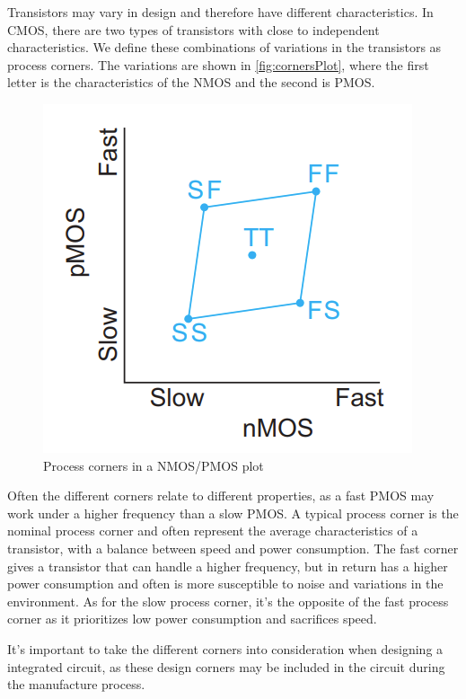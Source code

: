 Transistors may vary in design and therefore have different characteristics. In CMOS, there are two types of transistors with close to independent characteristics. We define these combinations of variations in the transistors as process corners. The variations are shown in \autoref{fig:cornersPlot}, where the first letter is the characteristics of the NMOS and the second is PMOS. 

\begin{figure}[H]
    \centering
    \includegraphics{Figures/CornersTheory.png}
    \caption{Process corners in a NMOS/PMOS plot \cite[p.245]{digital_design}}
    \label{fig:cornersPlot}
\end{figure}

Often the different corners relate to different properties, as a fast PMOS may work under a higher frequency than a slow PMOS. A typical process corner is the nominal process corner and often represent the average characteristics of a transistor, with a balance between speed and power consumption. The fast corner gives a transistor that can handle a higher frequency, but in return has a higher power consumption and often is more susceptible to noise and variations in the environment. As for the slow process corner, it's the opposite of the fast process corner as it prioritizes low power consumption and sacrifices speed.

It's important to take the different corners into consideration when designing a integrated circuit, as these design corners may be included in the circuit during the manufacture process. 



